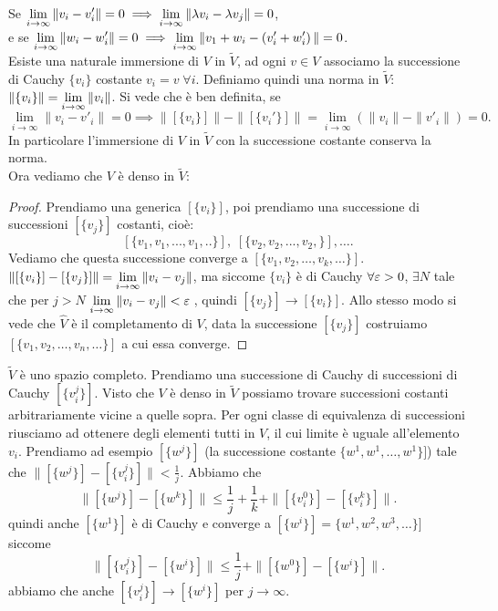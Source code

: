 Se $\displaystyle \lim_{i \to \infty} \|v_i - v'_i\| = 0 \implies
\lim_{i \to \infty} \|\lambda v_i - \lambda v_j\| = 0$, \\
e se $\displaystyle \lim_{i \to \infty} \|w_i - w'_i\| = 0 \implies
\lim_{i \to \infty} \|v_1 + w_i - \left( v'_i + w'_i \right) \| = 0$.\\
Esiste una naturale immersione di $V$ in $\widetilde{V}$, ad ogni $v\in V$
associamo la successione di Cauchy $\{v_i\}$ costante $v_i = v \; \forall i$.
Definiamo quindi una norma in $\widetilde{V}$: 
$ \displaystyle \|\{v_i\}\| = \lim_{i \to \infty} \|v_i\|$. Si vede che è ben definita,
se
\[
\lim_{i \to \infty} \|v_i - v'_i\| = 0 \implies 
\|[\{v_i\}]\| - \|[\{v_i'\}]\| = \lim_{i \to \infty} (\|v_i\| - \|v'_i\|) = 0
.\] 
In particolare l'immersione di $V$ in $\widetilde{V}$ con la successione
costante conserva la norma.\\
Ora vediamo che $V$ è denso in $\widetilde{V}$:
\begin{proof}
Prendiamo una generica $[\{v_i\}]$, poi prendiamo una successione di
successioni $[\{v_j\}]$ costanti, cioè:
\[
[\{v_1,v_1,...,v_1,..\}],\; [\{v_2,v_2,...,v_2,\}], \ldots
.\]
Vediamo che questa successione converge a
$[\{v_1, v_2, \ldots, v_k, \ldots\}]$.\\
$ \displaystyle \|[\{v_i\}] - [\{v_j\}]\| = \lim_{i \to \infty} \|v_i - v_j\|$,
ma siccome $\{v_i\}$ è di Cauchy $\forall \varepsilon > 0$, $\exists N$
tale che per $j > N$ $\displaystyle \lim_{i \to \infty} \|v_i - v_j\| < \varepsilon \;$,
quindi $[\{v_j\}] \to [\{v_i\}]$.
Allo stesso modo si vede che $\hat{V}$ è il completamento di $V$, data la
successione $[\{v_j\}]$ costruiamo $[\{v_1, v_2, \ldots, v_n, \ldots\}]$
a cui essa converge.
\end{proof}

$\widetilde{V}$ è uno spazio completo. Prendiamo una successione di Cauchy di
successioni di Cauchy $[\{v_i^j\}]$. Visto che $V$ è denso in $\widetilde{V}$
possiamo trovare successioni costanti arbitrariamente vicine a quelle sopra.
Per ogni classe di equivalenza di successioni riusciamo ad ottenere degli
elementi tutti in $V$, il cui limite è uguale all'elemento $v_i$.
Prendiamo ad esempio $[\{w^j\}]$ (la successione costante
$\{w^1, w^1, \ldots, w^1\}]$) tale che
$\| [\{w^j\}] - [\{v_i^j\}] \| < \frac{1}{j}$. Abbiamo che 
\[
\|[\{w^j\}] - [\{w^k\}]\| \leq
\frac{1}{j} + \frac{1}{k} + \|[\{v_i^0\}] - [\{v_i^k\}]\|
.\]
quindi anche $[\{w^1\}]$ è di Cauchy e converge a 
$[\{w^i\}] = \{w^1, w^2, w^3, \ldots\}]$ siccome
\[
\|[\{v_i^j\}] - [\{w^i\}]\| \leq \frac{1}{j} + \|[\{w^0\}] - [\{w^i\}]\|
.\]
abbiamo che anche $[\{v_i^j\}] \to [\{w^i\}]$ per $j \to \infty$.

